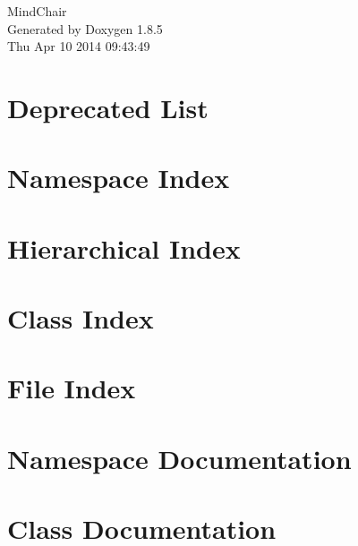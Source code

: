 \documentclass[twoside]{book}
\newcommand{\clearemptydoublepage}{%
  \newpage{\pagestyle{empty}\cleardoublepage}%
}
\begin{document}
\hypersetup{pageanchor=false}
\begin{titlepage}
\vspace*{7cm}
\begin{center}%
{\Large Mind\-Chair }\\
\vspace*{1cm}
{\large Generated by Doxygen 1.8.5}\\
\vspace*{0.5cm}
{\small Thu Apr 10 2014 09:43:49}\\
\end{center}
\end{titlepage}
\clearemptydoublepage
\tableofcontents
\clearemptydoublepage
{}
\hypersetup{pageanchor=true}

\chapter{Deprecated List}
\label{deprecated}
\hypertarget{deprecated}{}

\chapter{Namespace Index}

\chapter{Hierarchical Index}

\chapter{Class Index}

\chapter{File Index}

\chapter{Namespace Documentation}





\chapter{Class Documentation}
















\end{document}
